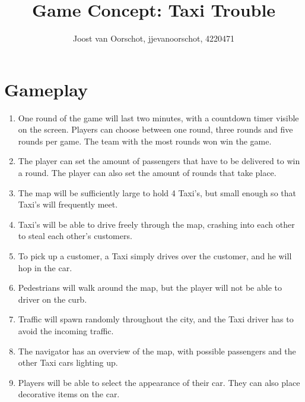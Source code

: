 \documentclass[11pt,twoside,a4paper]{article}
\title{Game Concept: Taxi Trouble} %
\author{
        Joost van Oorschot, jjevanoorschot, 4220471
}
\begin{document}
\maketitle
\section*{Gameplay}
\begin{enumerate}
\item One round of the game will last two minutes, with a countdown timer visible on the screen. Players can choose between one round, three rounds and five rounds per game. The team with the most rounds won win the game.

\item The player can set the amount of passengers that have to be delivered to win a round. The player can also set the amount of rounds that take place.

\item The map will be sufficiently large to hold 4 Taxi's, but small enough so that Taxi's will frequently meet. 

\item Taxi's will be able to drive freely through the map, crashing into each other to steal each other's customers.

\item To pick up a customer, a Taxi simply drives over the customer, and he will hop in the car. 

\item Pedestrians will walk around the map, but the player will not be able to driver on the curb.

\item Traffic will spawn randomly throughout the city, and the Taxi driver has to avoid the incoming traffic.

\item The navigator has an overview of the map, with possible passengers and the other Taxi cars lighting up.

\item Players will be able to select the appearance of their car. They can also place decorative items on the car.
\end{enumerate}
\end{document}
